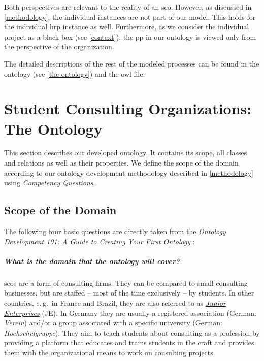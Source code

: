 \documentclass[a4paper, DIV=13, BCOR=0cm]{scrbook}
\newcommand{\eg}{e.\,g.\ }
\begin{document}
Both perspectives are relevant to the reality of an \gls{sco}. However, as discussed in \autoref{methodology}, the individual instances are not part of our model. This holds for the individual \gls{hrp} instance as well. Furthermore, as we consider the individual project as a black box (see \autoref{context}), the \gls{pp} in our ontology is viewed only from the perspective of the organization.

The detailed descriptions of the rest of the modeled processes can be found in the ontology (see \autoref{the-ontology}) and the \gls{owl} file.

\chapter[Student Consulting Organizations: The Ontology \\\textcolor{gray}{
	{\footnotesize \textsl{Declares the ontology in a readable format.}}
}]{Student Consulting Organizations: The Ontology}
\label{the-ontology}
This section describes our developed ontology. It contains its scope, all classes and relations as well as their properties. We define the scope of the domain according to our ontology development methodology described in \autoref{methodology} using \textit{Competency Questions}.

\section{Scope of the Domain}
\label{competency-questions}
The following four basic questions are directly taken from the \textit{Ontology Development 101: A Guide to Creating Your First Ontology} \cite{guide-to-ontology}:

\paragraph{What is the domain that the ontology will cover?}
\glspl{sco} are a form of consulting firms.  They can be compared to small consulting businesses, but are staffed -- most of the time exclusively -- by students. In other countries, \eg in France and Brazil, they are also referred to as \href{https://en.wikipedia.org/wiki/Junior_enterprise}{\textit{Junior Enterprises}} (JE). In Germany they are usually a registered association (German: \textit{Verein}) and/or a group associated with a specific university (German: \textit{Hochschulgruppe}). They aim to teach students about consulting as a profession by providing a platform that educates and trains students in the craft and provides them with the organizational means to work on consulting projects.
\end{document}
